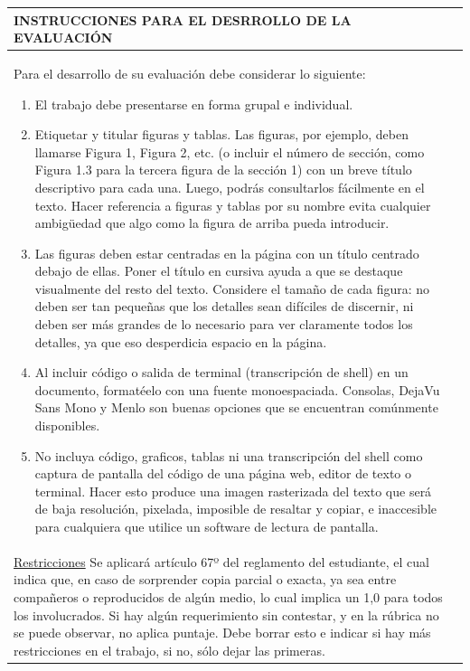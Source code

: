 \documentclass[12pt]{article}
\newcommand{\reglas}{%
	\item El trabajo debe presentarse en forma grupal e individual.
	\item Etiquetar y titular figuras y tablas. Las figuras, por ejemplo, deben llamarse Figura 1, Figura 2,
	etc. (o incluir el número de sección, como Figura 1.3 para la tercera figura de la sección 1) con
	un breve título descriptivo para cada una. Luego, podrás consultarlos fácilmente en el texto.
	Hacer referencia a figuras y tablas por su nombre evita cualquier ambigüedad que algo como
	la figura de arriba pueda introducir.
	\item Las figuras deben estar centradas en la página con un título centrado debajo de ellas. Poner el
	título en cursiva ayuda a que se destaque visualmente del resto del texto. Considere el tamaño
	de cada figura: no deben ser tan pequeñas que los detalles sean difíciles de discernir, ni deben
	ser más grandes de lo necesario para ver claramente todos los detalles, ya que eso desperdicia
	espacio en la página.
	\item Al incluir código o salida de terminal (transcripción de shell) en un documento, formatéelo con
	una fuente monoespaciada. Consolas, DejaVu Sans Mono y Menlo son buenas opciones que se
	encuentran comúnmente disponibles.
	\item No incluya código, graficos, tablas ni una transcripción del shell como captura de pantalla
	del código de una página web, editor de texto o terminal. Hacer esto produce una imagen
	rasterizada del texto que será de baja resolución, pixelada, imposible de resaltar y copiar, e
	inaccesible para cualquiera que utilice un software de lectura de pantalla.
	
}
\newcommand{\restricciones}{%
Se aplicará artículo 67º del reglamento del estudiante, el cual indica que, en caso de sorprender copia parcial o exacta, ya sea entre compañeros o reproducidos de algún medio, lo cual implica un 1,0 para todos los involucrados.
Si hay algún requerimiento sin contestar, y en la rúbrica no se puede observar, no aplica puntaje.
Debe borrar esto e indicar si hay más restricciones en el trabajo, si no, sólo dejar las primeras.
}
\begin{document}
{  \newpage
  \begin{longtable}{|p{}|@{}c@{}}
    \hline
    \centering\cellcolor{cyan}\textbf{\color{white}INSTRUCCIONES PARA EL DESRROLLO DE LA EVALUACIÓN}&\\\hline
    {\small
      \vspace{7pt}Para el desarrollo de su evaluación debe considerar lo siguiente:%
      \setlist[enumerate]{itemsep=0pt,parsep=0pt,partopsep=0pt,topsep=0pt}
      \begin{enumerate}
        \reglas
      \end{enumerate}
    }&\\
    {\small
      \setlist[enumerate]{}
      \underline{Restricciones}\newline
      \noindent\restricciones
    }&\\\hline
  \end{longtable}
}
\end{document}

